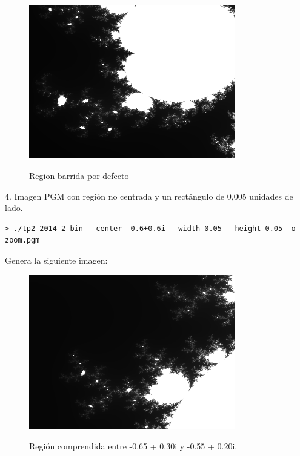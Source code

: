\documentclass[a4paper,10pt]{article}
\begin{document}
\begin{figure}[H]
\begin{center}
\includegraphics[width=0.8\textwidth]{./porDefecto.png}
\label{fig:def}
\caption{Region barrida por defecto}
\end{center}
\end{figure}


4. Imagen PGM con regi\'on no centrada y un rect\'angulo de 0,005 unidades de lado.
\begin{verbatim}
> ./tp2-2014-2-bin --center -0.6+0.6i --width 0.05 --height 0.05 -o zoom.pgm
\end{verbatim}
Genera la siguiente imagen:

\begin{figure}[H]
\begin{center}
\includegraphics[width=0.8\textwidth]{./zoom.png}
\label{fig:zoom}
\caption{Regi\'on comprendida entre -0.65 + 0.30i y -0.55 + 0.20i.}
\end{center}
\end{figure}
\end{document}
